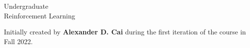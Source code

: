 \documentclass[12pt,twoside,letterpaper,openany]{book}
\begin{document}
    
\frontmatter

\begin{titlepage}
    
    {\Huge Undergraduate \\ Reinforcement Learning}


    Initially created by \textbf{Alexander D. Cai} during the first iteration of
    the course in Fall 2022.

    \tableofcontents

\end{titlepage}



\mainmatter






\end{document}
